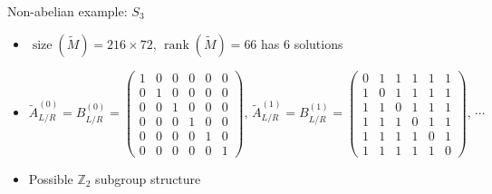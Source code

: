 \documentclass{fdubeamer}
\newcommand{\1}{\mathbb{1}}
\newcommand{\Z}{\mathbb{Z}}
\DeclareMathOperator{\rank}{rank}
\begin{document}
\begin{frame}{Non-abelian example: \texorpdfstring{$S_3$}{𝑆₃}}
\begin{itemize}
    \begin{itemize}
      \item $\operatorname{size}(\tilde{M})=216\times72, \, \rank(\tilde{M})=66$
        \textrightarrow{} has 6 solutions \\[1ex]
      \item $
          \tilde{A}^{(0)}_{L/R} = B^{(0)}_{L/R} = \left( \begin{smallmatrix}
            1 & 0 & 0 & 0 & 0 & 0 \\
            0 & 1 & 0 & 0 & 0 & 0 \\
            0 & 0 & 1 & 0 & 0 & 0 \\
            0 & 0 & 0 & 1 & 0 & 0 \\
            0 & 0 & 0 & 0 & 1 & 0 \\
            0 & 0 & 0 & 0 & 0 & 1
          \end{smallmatrix} \right)\!, \,
          \tilde{A}^{(1)}_{L/R} = B^{(1)}_{L/R} = \left( \begin{smallmatrix}
            0 & 1 & 1 & 1 & 1 & 1 \\
            1 & 0 & 1 & 1 & 1 & 1 \\
            1 & 1 & 0 & 1 & 1 & 1 \\
            1 & 1 & 1 & 0 & 1 & 1 \\
            1 & 1 & 1 & 1 & 0 & 1 \\
            1 & 1 & 1 & 1 & 1 & 0
          \end{smallmatrix} \right)\!, \, \cdots
        $ \\[1ex]
      \item Possible $\Z_2$ subgroup structure
    \end{itemize}
\end{itemize}

\end{frame}
\end{document}
